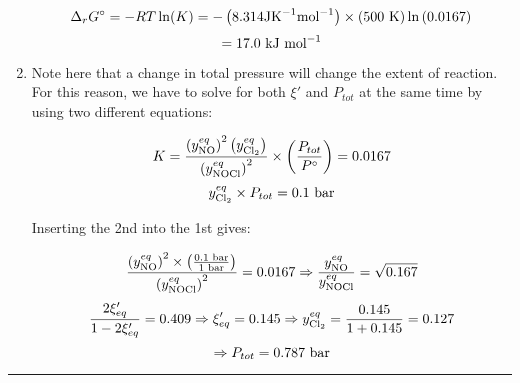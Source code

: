 \begin{enumerate}
$$\Delta_rG^\circ = -RT\ln(K) = -\left(8.314\textnormal{JK}^{-1}\textnormal{mol}^{-1}\right)\times\left(500\textnormal{ K}\right)\ln\left(0.0167\right)$$
$$ = 17.0\textnormal{ kJ mol}^{-1}$$

\item Note here that a change in total pressure will change the extent of reaction. For this reason, we have to solve for both $\xi'$ and $P_{tot}$ at the same time by using two different equations:

$$K =  \frac{\left(y_{\textnormal{NO}}^{eq}\right)^2\left(y_{\textnormal{Cl}_2}^{eq}\right)}{\left(y_{\textnormal{NOCl}}^{eq}\right)^2}\times\left(\frac{P_{tot}}{P^\circ}\right) = 0.0167$$
$$y_{\textnormal{Cl}_2}^{eq}\times P_{tot} = 0.1\textnormal{ bar}$$

Inserting the 2nd into the 1st gives:

$$\frac{\left(y_{\textnormal{NO}}^{eq}\right)^2\times\left(\frac{0.1\textnormal{ bar}}{1\textnormal{ bar}}\right)} {\left(y_{\textnormal{NOCl}}^{eq}\right)^2} = 0.0167\Rightarrow \frac{y_{\textnormal{NO}}^{eq}}{y_{\textnormal{NOCl}}^{eq}} = \sqrt{0.167}$$
$$\frac{2\xi'_{eq}}{1-2\xi'_{eq}} = 0.409\Rightarrow \xi'_{eq} = 0.145\Rightarrow y_{\textnormal{Cl}_2}^{eq} = \frac{0.145}{1 + 0.145} = 0.127$$
$$\Rightarrow P_{tot} = 0.787\textnormal{ bar}$$

\end{enumerate}

\hrule\vspace{0.5cm}
